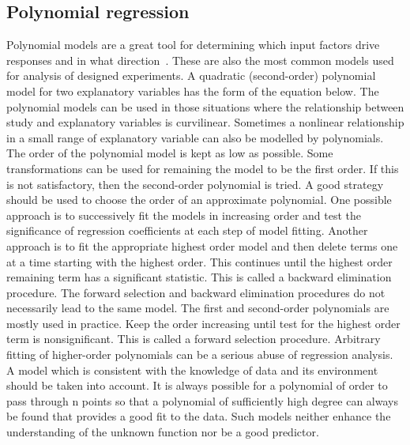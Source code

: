 \subsection{Polynomial regression} \label{sec:poly}
Polynomial models are a great tool for determining which input factors drive responses and in what direction~\cite{poly}.
These are also the most common models used for analysis of designed experiments.
A quadratic (second-order) polynomial model for two explanatory variables has the form of the equation below.
The polynomial models can be used in those situations where the relationship between study and explanatory variables is curvilinear.
Sometimes a nonlinear relationship in a small range of explanatory variable can also be modelled by polynomials.
The order of the polynomial model is kept as low as possible. Some transformations can be used for remaining the model to be the first order.
If this is not satisfactory, then the second-order polynomial is tried.
A good strategy should be used to choose the order of an approximate polynomial.
One possible approach is to successively fit the models in increasing order and test the significance of regression coefficients at each step of model fitting.
Another approach is to fit the appropriate highest order model and then delete terms one at a time starting with the highest order.
This continues until the highest order remaining term has a significant statistic.
This is called a backward elimination procedure. The forward selection and backward elimination procedures do not necessarily lead to the same model.
The first and second-order polynomials are mostly used in practice.
Keep the order increasing until test for the highest order term is nonsignificant.
This is called a forward selection procedure. Arbitrary fitting of higher-order polynomials can be a serious abuse of regression analysis.
A model which is consistent with the knowledge of data and its environment should be taken into account.
It is always possible for a polynomial of order to pass through n points so that a polynomial of sufficiently high degree can always be found that provides a good fit to the data.
Such models neither enhance the understanding of the unknown function nor be a good predictor.
